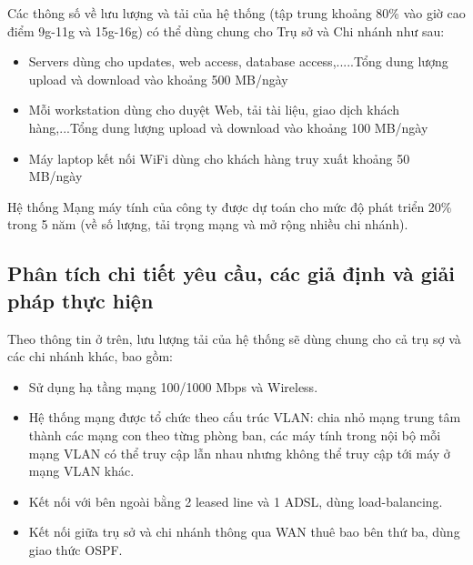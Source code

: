 \documentclass[a4paper]{article}
\begin{document}
Các thông số về lưu lượng và tải của hệ thống (tập trung khoảng 80\% vào giờ cao điểm 9g-11g và 15g-16g) có thể dùng chung cho Trụ sở và Chi nhánh như sau:
\begin{itemize}
    \item Servers dùng cho updates, web access, database access,.....Tổng dung lượng upload và download vào khoảng 500 MB/ngày
    \item Mỗi workstation dùng cho duyệt Web, tải tài liệu, giao dịch khách hàng,...Tổng dung lượng upload và download vào khoảng 100 MB/ngày
    \item Máy laptop kết nối WiFi dùng cho khách hàng truy xuất khoảng 50 MB/ngày
\end{itemize}
Hệ thống Mạng máy tính của công ty được dự toán cho mức độ phát triển 20\% trong 5 năm (về số lượng, tải trọng mạng và mở rộng nhiều chi nhánh).

\subsection{Phân tích chi tiết yêu cầu, các giả định và giải pháp thực hiện}
Theo thông tin ở trên, lưu lượng tải của hệ thống sẽ dùng chung cho cả trụ sợ và các chi nhánh khác, bao gồm:
\begin{itemize}
    \item Sử dụng hạ tầng mạng 100/1000 Mbps và Wireless.%
    \item Hệ thống mạng được tổ chức theo cấu trúc VLAN: chia nhỏ mạng trung tâm thành các mạng con theo từng phòng ban, các máy tính trong nội bộ mỗi mạng VLAN có thể truy cập lẫn nhau nhưng không thể truy cập tới máy ở mạng VLAN khác.
    \item Kết nối với bên ngoài bằng 2 leased line và 1 ADSL, dùng load-balancing.
    \item Kết nối giữa trụ sở và chi nhánh thông qua WAN thuê bao bên thứ ba, dùng giao thức OSPF.
\end{itemize}
\end{document}
